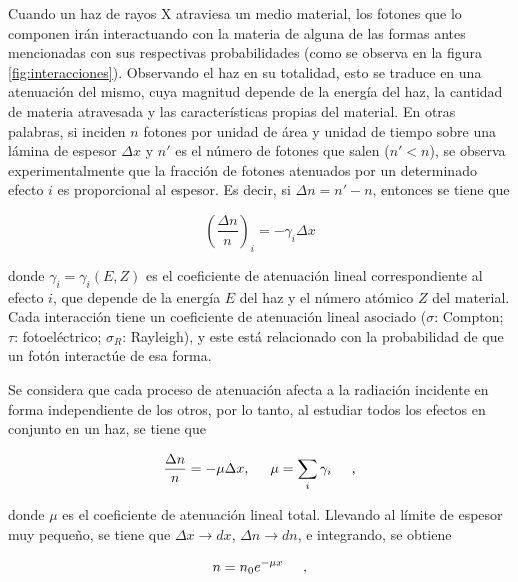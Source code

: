 Cuando un haz de rayos X atraviesa un medio material, los fotones que lo
componen irán interactuando con la materia de alguna de las formas antes
mencionadas con sus respectivas probabilidades (como se observa en la figura
\ref{fig:interacciones}). Observando el haz 
en su totalidad, esto se traduce en una atenuación
del mismo, cuya magnitud depende de la energía del haz, la cantidad de materia 
atravesada y las características propias del material. En otras palabras, si
inciden $n$ fotones por unidad de área y unidad de tiempo sobre una lámina de
espesor $\Delta x$ y $n'$ es el número de fotones que salen ($n'<n$), se observa
experimentalmente que la fracción de fotones atenuados por un determinado efecto $i$
es proporcional al espesor. Es decir, si $\Delta n = n' - n$, entonces se tiene que

\begin{equation}
    \left(\frac{\Delta n}{n}\right)_i = -\gamma_i \Delta x
    \label{eq:atenuacion1}
\end{equation}

\noindent donde $\gamma_i = \gamma_i(E,Z)$ es el coeficiente de atenuación lineal correspondiente
al efecto $i$, que depende de la energía $E$ del haz y el número atómico $Z$ del 
material. Cada interacción tiene un coeficiente de atenuación lineal asociado ($\sigma$: Compton;
$\tau$: fotoeléctrico; $\sigma_R$: Rayleigh), y este está relacionado con la probabilidad
de que un fotón interactúe de esa forma. \cite{Als-Nielsen2011}

Se considera que cada proceso de
atenuación afecta a la radiación incidente en forma independiente de los otros,
por lo tanto, al estudiar todos los efectos en conjunto en un haz, se tiene que

\begin{equation}
    \frac{\Delta n}{n} = -\mu \Delta x, \hspace{5mm} \mu = \sum_{i} \gamma_i \hspace{5mm},
    \label{eq:aten_tot}
\end{equation}

\noindent donde $\mu$ es el coeficiente de atenuación lineal total. Llevando al límite de 
espesor muy pequeño, se tiene que $\Delta x \rightarrow dx$, $\Delta n \rightarrow dn$, e integrando, se obtiene

\begin{equation}
    n = n_0 e^{-\mu x} \hspace{5mm},
    \label{eq:atenuacion}
\end{equation}

